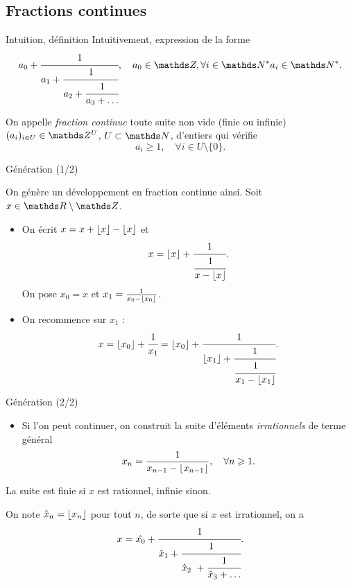 
\subsection{Fractions continues}

\begin{frame}{Intuition, définition}
Intuitivement, expression de la forme \[a_0 + \cfrac{1}{a_1 + \cfrac{1}{a_2 +
\cfrac{1}{a_3 + \dots}}}, \quad a_0\in \Z, \forall i \in \N^* a_i \in \N^*.\]

\pause

\begin{definition}
	On appelle \emph{fraction continue} toute suite non vide (finie ou infinie)
	$(a_i)_{i\in U} \in \Z^U$, $U\subset \N$, d'entiers qui vérifie \[a_i
	\geq 1, \quad \forall i\in U\setminus\{0\}.\]
\end{definition}
\end{frame}

\begin{frame}{Génération (1/2)}

On génère un développement en fraction continue ainsi. Soit $x\in
\R\setminus{\Z}$.

\begin{itemize}
	\item On écrit $x = x + \lfloor x\rfloor - \lfloor x\rfloor$ et \[x = \lfloor x\rfloor +
	\cfrac{1}{\cfrac{1}{x - \lfloor x\rfloor}}.\] On pose $x_0 = x$ et $x_1 =
	\frac{1}{x_0 - \lfloor x_0\rfloor}$.

	\pause

	\item On recommence sur $x_1$ : \[x = \lfloor x_0\rfloor + \cfrac{1}{x_1} =
	\lfloor x_0\rfloor + \cfrac{1}{\lfloor x_1\rfloor + \cfrac{1}{\cfrac{1}{x_1 - \lfloor x_1\rfloor}}}.\] 
\end{itemize}
\end{frame}

\begin{frame}{Génération (2/2)}
\begin{itemize}
	\item Si l'on peut continuer, on construit la suite d'éléments
	\emph{irrationnels} de terme général \[x_n = \frac{1}{x_{n-1} -
	\lfloor x_{n-1}\rfloor}, \quad \forall n \geqslant 1.\]
\end{itemize}

\pause
\vspace{1em}
La suite est finie si $x$ est rationnel, infinie sinon. \vspace{1em}

On note $\hat{x}_n = \lfloor x_n\rfloor$ pour tout $n$, de sorte que si $x$ est
irrationnel, on a \[x = \hat{x_0} + \cfrac{1}{\hat{x}_1 + \cfrac{1}{\hat{x}_2 +
\cfrac{1}{\hat{x}_3 + \dots}}}.\]
\end{frame}

